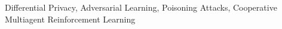 \documentclass[conference]{IEEEtran}
\begin{document}
\begin{IEEEkeywords}
Differential Privacy, Adversarial Learning, Poisoning Attacks, Cooperative Multiagent Reinforcement Learning
\end{IEEEkeywords}











\nocite{*}

\end{document}

